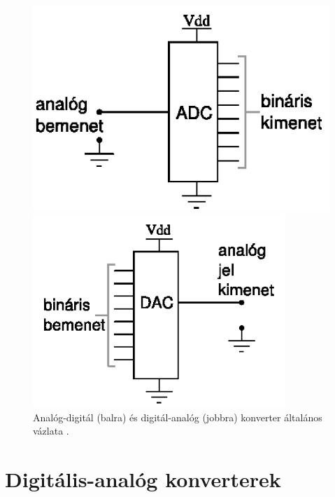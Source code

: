 \documentclass[12pt]{article}
\theoremstyle{plain}
\begin{document}
\begin{figure}[H]
	\centering
	\begin{minipage}{0.47\textwidth}
		\centering
		\includegraphics[width=1.0\textwidth]{./media/ADC_sketch.png}
	\end{minipage}\hfill
	\begin{minipage}{0.53\textwidth}
		\centering
		\includegraphics[width=0.85\textwidth]{./media/DAC_sketch.png}
	\end{minipage}
	\caption{Analóg-digitál (balra) és digitál-analóg (jobbra) konverter általános vázlata \cite{Bagoly}.}
	\label{fig:konverter_vazlat}
\end{figure}



\section{Digitális-analóg konverterek}
\end{document}
